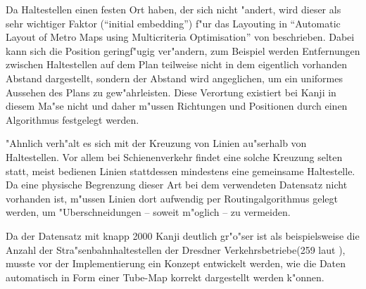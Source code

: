 Da Haltestellen einen festen Ort haben, der sich nicht "andert, wird dieser als sehr wichtiger Faktor ("`initial embedding"') f"ur das Layouting in "`Automatic Layout of Metro Maps using Multicriteria Optimisation"' von \cite{automaticlayoutmetro08} beschrieben. Dabei kann sich die Position geringf"ugig ver"andern, zum Beispiel werden Entfernungen zwischen Haltestellen auf dem Plan teilweise nicht in dem eigentlich vorhanden Abstand dargestellt, sondern der Abstand wird angeglichen, um ein uniformes Aussehen des Plans zu gew"ahrleisten. Diese Verortung existiert bei Kanji in diesem Ma"se nicht und daher m"ussen Richtungen und Positionen durch einen Algorithmus festgelegt werden. 

"Ahnlich verh"alt es sich mit der Kreuzung von Linien au"serhalb von Haltestellen. Vor allem bei Schienenverkehr findet eine solche Kreuzung selten statt, meist bedienen Linien stattdessen mindestens eine gemeinsame Haltestelle. Da eine physische Begrenzung dieser Art bei dem verwendeten Datensatz nicht vorhanden ist, m"ussen Linien dort aufwendig per Routingalgorithmus gelegt werden, um "Uberschneidungen – soweit m"oglich – zu vermeiden.

Da der Datensatz mit knapp 2000 Kanji deutlich gr"o"ser ist als beispielsweise die Anzahl der Stra"senbahnhaltestellen der Dresdner Verkehrsbetriebe(259 laut \cite{dvbag}), musste vor der Implementierung ein Konzept entwickelt werden, wie die Daten automatisch in Form einer Tube-Map korrekt dargestellt werden k"onnen.

